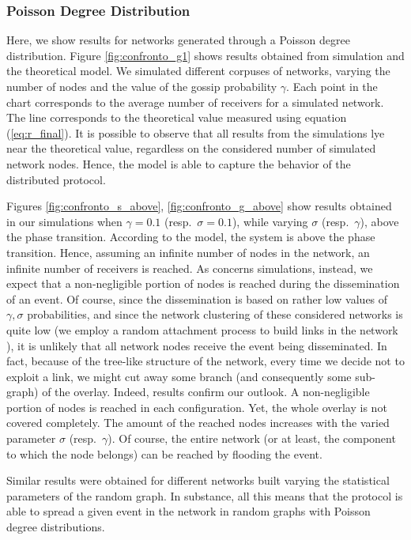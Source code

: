 \documentclass[10pt, conference, compsocconf]{IEEEtran}
\begin{document}
\subsubsection{Poisson Degree Distribution}

Here, we show results for networks generated through a Poisson degree distribution.
Figure \ref{fig:confronto_g1} shows results obtained from simulation and the theoretical model. We simulated different corpuses of networks, varying the number of nodes and the value of the gossip probability $\gamma$. 
Each point in the chart corresponds to the average number of receivers for a simulated network. The line corresponds to the theoretical value measured using equation (\ref{eq:r_final}). It is possible to observe that all results from the simulations lye near the theoretical value, regardless on the considered number of simulated network nodes. Hence, the model is able to capture the behavior of the distributed protocol.

Figures \ref{fig:confronto_s_above}, \ref{fig:confronto_g_above} show results obtained in our simulations when $\gamma=0.1$ (resp.~$\sigma=0.1$), while varying $\sigma$ (resp.~$\gamma$), above the phase transition. According to the model, the system is above the phase transition. Hence, assuming an infinite number of nodes in the network, an infinite number of receivers is reached. As concerns simulations, instead, we expect that a non-negligible portion of nodes is reached during the dissemination of an event. Of course, since the dissemination is based on rather low values of $\gamma, \sigma$ probabilities, and since the network clustering of these considered networks is quite low (we employ a random attachment process to build links in the network \cite{newman03thestructure,newmanHandbook}),
it is unlikely that all network nodes receive the event being disseminated.
In fact, because of the tree-like structure of the network, every time we decide not to exploit a link, we might cut away some branch (and consequently some sub-graph) of the overlay.
Indeed, results confirm our outlook. 
A non-negligible portion of nodes is reached in each configuration. Yet, the whole overlay is not covered completely. The amount of the reached nodes increases with the varied parameter $\sigma$ (resp.~$\gamma$). Of course, the entire network (or at least, the component to which the node belongs) can be reached by flooding the event.

Similar results were obtained for different networks built varying the statistical parameters of the random graph. In substance, all this means that the protocol is able to spread a given event in the network in random graphs with Poisson degree distributions.
\end{document}
